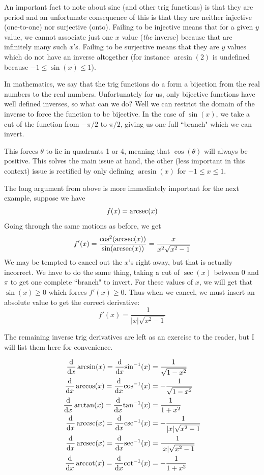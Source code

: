 \begin{example}
	An important fact to note about sine (and other trig functions) is that they are period and an unfortunate consequence of this is that they are neither injective (one-to-one) nor surjective (onto). Failing to be injective means that for a given $y$ value, we cannot associate just one $x$ value (\emph{the} inverse) because that are infinitely many such $x$'s. Failing to be surjective means that they are $y$ values which do not have an inverse altogether (for instance $\arcsin(2)$ is undefined because $-1 \leq \sin(x) \leq 1$).
	
	In mathematics, we say that the trig functions do a form a bijection from the real numbers to the real numbers. Unfortunately for us, only bijective functions have well defined inverses, so what can we do? Well we can restrict the domain of the inverse to force the function to be bijective. In the case of $\sin(x)$, we take a cut of the function from $-\pi/2$ to $\pi/2$, giving us one full ``branch" which we can invert.
	
	This forces $\theta$ to lie in quadrants 1 or 4, meaning that $\cos(\theta)$ will always be positive. This solves the main issue at hand, the other (less important in this context) issue is rectified by only defining $\arcsin(x)$ for $-1 \leq x \leq 1$.
\end{example}

\newpage 
\begin{example}
	The long argument from above is more immediately important for the next example, suppose we have
	\[ f(x) = \arcsec(x) \]
	Going through the same motions as before, we get
	\[ f'(x) = \frac{\cos^2(\arcsec(x))}{\sin(\arcsec(x))} = \frac{x}{x^2\sqrt{x^2 - 1}} \]
	We may be tempted to cancel out the $x$'s right away, but that is actually incorrect. We have to do the same thing, taking a cut of $\sec(x)$ between 0 and $\pi$ to get one complete ``branch" to invert. For these values of $x$, we will get that $\sin(x) \geq 0$ which forces $f'(x) \geq 0$. Thus when we cancel, we must insert an absolute value to get the correct derivative:
	\[ f'(x) = \frac{1}{|x|\sqrt{x^2 - 1}}\]
\end{example}

The remaining inverse trig derivatives are left as an exercise to the reader, but I will list them here for convenience.

\begin{proposition}
	\begin{align*}
		\dv{x} \arcsin(x) = \dv{x} \inv\sin(x) &= \frac{1}{\sqrt{1 - x^2}} \\
		\dv{x} \arccos(x) = \dv{x} \inv\cos(x) &= -\frac{1}{\sqrt{1 - x^2}} \\
		\dv{x} \arctan(x) = \dv{x} \inv\tan(x) &= \frac{1}{1 + x^2} \\
		\dv{x} \arccsc(x) = \dv{x} \inv\csc(x) &= -\frac{1}{|x|\sqrt{x^2 - 1}} \\
		\dv{x} \arcsec(x) = \dv{x} \inv\sec(x) &= \frac{1}{|x|\sqrt{x^2 - 1}} \\
		\dv{x} \arccot(x) = \dv{x} \inv\cot(x) &= -\frac{1}{1 + x^2} 
	\end{align*}
\end{proposition}

